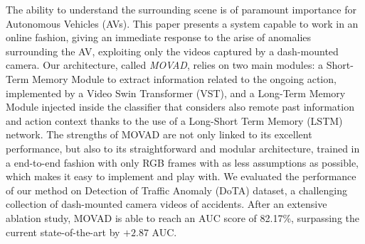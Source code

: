 The ability to understand the surrounding scene is of paramount importance for Autonomous Vehicles (AVs).
This paper presents a system capable to work in an online fashion, giving an immediate response to the arise of anomalies surrounding the AV, exploiting only the videos captured by a dash-mounted camera.
Our architecture, called \emph{MOVAD}, relies on two main modules: a Short-Term Memory Module to extract information related to the ongoing action, implemented by a Video Swin Transformer (VST), and a Long-Term Memory Module injected inside the classifier that considers also remote past information and action context thanks to the use of a Long-Short Term Memory (LSTM) network. 
The strengths of MOVAD are not only linked to its excellent performance, but also to its straightforward and modular architecture, trained in a end-to-end fashion with only RGB frames with as less assumptions as possible, which makes it easy to implement and play with.
We evaluated the performance of our method on Detection of Traffic Anomaly (DoTA) dataset, a challenging collection of dash-mounted camera videos of accidents.
After an extensive ablation study, MOVAD is able to reach an AUC score of 82.17\%, surpassing the current state-of-the-art by $+2.87$ AUC.